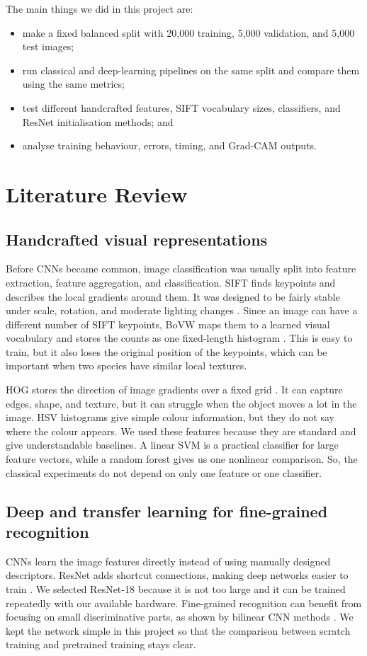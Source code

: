 \documentclass[10pt,twocolumn,letterpaper]{article}
\begin{document}
The main things we did in this project are:
\begin{itemize}
    \item make a fixed balanced split with 20,000 training, 5,000 validation, and 5,000 test images;
    \item run classical and deep-learning pipelines on the same split and compare them using the same metrics;
    \item test different handcrafted features, SIFT vocabulary sizes, classifiers, and ResNet initialisation methods; and
    \item analyse training behaviour, errors, timing, and Grad-CAM outputs.
\end{itemize}

\section{Literature Review}
\subsection{Handcrafted visual representations}
Before CNNs became common, image classification was usually split into feature extraction, feature aggregation, and classification.  SIFT finds keypoints and describes the local gradients around them.  It was designed to be fairly stable under scale, rotation, and moderate lighting changes \cite{lowe2004distinctive}.  Since an image can have a different number of SIFT keypoints, BoVW maps them to a learned visual vocabulary and stores the counts as one fixed-length histogram \cite{csurka2004visual}.  This is easy to train, but it also loses the original position of the keypoints, which can be important when two species have similar local textures.

HOG stores the direction of image gradients over a fixed grid \cite{dalal2005histograms}.  It can capture edges, shape, and texture, but it can struggle when the object moves a lot in the image.  HSV histograms give simple colour information, but they do not say where the colour appears.  We used these features because they are standard and give understandable baselines.  A linear SVM is a practical classifier for large feature vectors, while a random forest gives us one nonlinear comparison.  So, the classical experiments do not depend on only one feature or one classifier.

\subsection{Deep and transfer learning for fine-grained recognition}
CNNs learn the image features directly instead of using manually designed descriptors.  ResNet adds shortcut connections, making deep networks easier to train \cite{he2016deep}.  We selected ResNet-18 because it is not too large and it can be trained repeatedly with our available hardware.  Fine-grained recognition can benefit from focusing on small discriminative parts, as shown by bilinear CNN methods \cite{lin2015bilinear}.  We kept the network simple in this project so that the comparison between scratch training and pretrained training stays clear.
\end{document}
